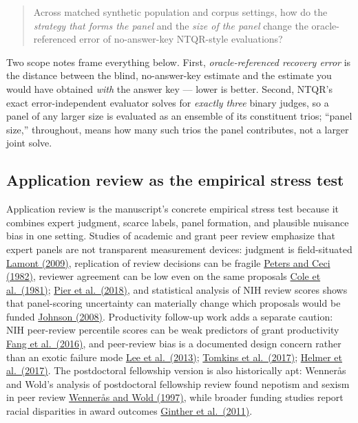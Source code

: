 \documentclass[
]{article}
\begin{document}
\begin{quote}
Across matched synthetic population and corpus settings, how do the
\emph{strategy that forms the panel} and the \emph{size of the panel}
change the oracle-referenced error of no-answer-key NTQR-style
evaluations?
\end{quote}

Two scope notes frame everything below. First, \emph{oracle-referenced
recovery error} is the distance between the blind, no-answer-key
estimate and the estimate you would have obtained \emph{with} the answer
key --- lower is better. Second, NTQR's exact error-independent
evaluator solves for \emph{exactly three} binary judges, so a panel of
any larger size is evaluated as an ensemble of its constituent trios;
``panel size,'' throughout, means how many such trios the panel
contributes, not a larger joint solve.

\subsection{Application review as the empirical stress
test}\label{application-review-as-the-empirical-stress-test}

Application review is the manuscript's concrete empirical stress test
because it combines expert judgment, scarce labels, panel formation, and
plausible nuisance bias in one setting. Studies of academic and grant
peer review emphasize that expert panels are not transparent measurement
devices: judgment is field-situated
\href{https://doi.org/10.4159/9780674054158}{Lamont (2009)}, replication
of review decisions can be fragile
\href{https://doi.org/10.1017/S0140525X00011183}{Peters and Ceci
(1982)}, reviewer agreement can be low even on the same proposals
\href{https://doi.org/10.1126/science.7302566}{Cole et al.~(1981)};
\href{https://doi.org/10.1073/pnas.1714379115}{Pier et al.~(2018)}, and
statistical analysis of NIH review scores shows that panel-scoring
uncertainty can materially change which proposals would be funded
\href{https://doi.org/10.1073/pnas.0804538105}{Johnson (2008)}.
Productivity follow-up work adds a separate caution: NIH peer-review
percentile scores can be weak predictors of grant productivity
\href{https://doi.org/10.7554/eLife.13323}{Fang et al.~(2016)}, and
peer-review bias is a documented design concern rather than an exotic
failure mode \href{https://doi.org/10.1002/asi.22784}{Lee et
al.~(2013)}; \href{https://doi.org/10.1073/pnas.1707323114}{Tomkins et
al.~(2017)}; \href{https://doi.org/10.7554/eLife.21718}{Helmer et
al.~(2017)}. The postdoctoral fellowship version is also historically
apt: Wennerås and Wold's analysis of postdoctoral fellowship review
found nepotism and sexism in peer review
\href{https://doi.org/10.1038/387341a0}{Wennerås and Wold (1997)}, while
broader funding studies report racial disparities in award outcomes
\href{https://doi.org/10.1126/science.1196783}{Ginther et al.~(2011)}.
\end{document}
